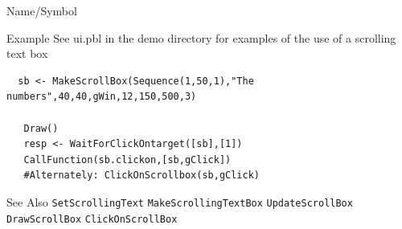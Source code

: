 \begin{desc}{Name/Symbol}
\item[Example]      	
See ui.pbl in the demo directory for examples of the use of a scrolling text box


\begin{verbatim}
  sb <- MakeScrollBox(Sequence(1,50,1),"The numbers",40,40,gWin,12,150,500,3)

   Draw()
   resp <- WaitForClickOntarget([sb],[1])
   CallFunction(sb.clickon,[sb,gClick])
   #Alternately: ClickOnScrollbox(sb,gClick) 
\end{verbatim}

\item[See Also]
\verb+SetScrollingText+
\verb+MakeScrollingTextBox+
\verb+UpdateScrollBox+
\verb+DrawScrollBox+
\verb+ClickOnScrollBox+
\end{desc}



